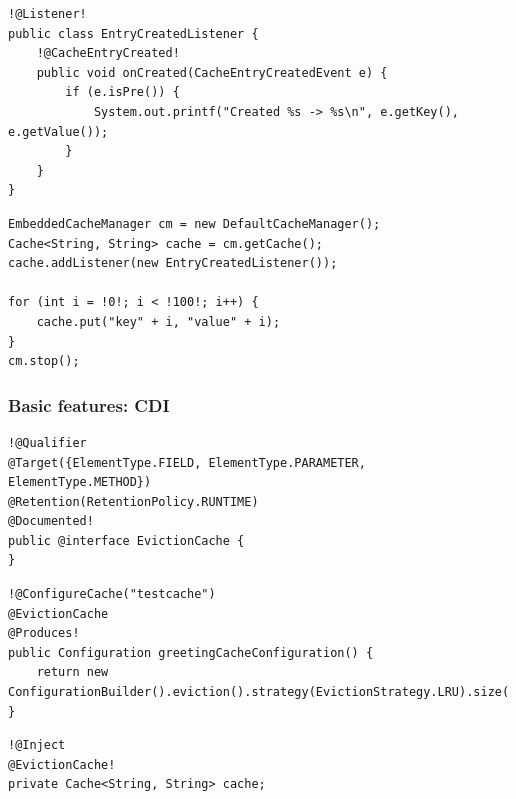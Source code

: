 \documentclass[10pt,utf8]{beamer}
\begin{document}
\begin{frame}[fragile]
	\begin{lstlisting}[style=Java]
!@Listener!
public class EntryCreatedListener {
    !@CacheEntryCreated!
    public void onCreated(CacheEntryCreatedEvent e) {
        if (e.isPre()) {
            System.out.printf("Created %s -> %s\n", e.getKey(), e.getValue());
        }
    }
}
	\end{lstlisting}
	\begin{lstlisting}[style=Java]
EmbeddedCacheManager cm = new DefaultCacheManager();
Cache<String, String> cache = cm.getCache();
cache.addListener(new EntryCreatedListener());

for (int i = !0!; i < !100!; i++) {
    cache.put("key" + i, "value" + i);
}
cm.stop();
	\end{lstlisting}
\end{frame}

\begin{frame}[fragile]
	\frametitle{Basic features: CDI}
	\begin{lstlisting}[style=Java]
!@Qualifier
@Target({ElementType.FIELD, ElementType.PARAMETER, ElementType.METHOD})
@Retention(RetentionPolicy.RUNTIME)
@Documented!
public @interface EvictionCache {
}  
	\end{lstlisting}
	\begin{lstlisting}[style=Java]
!@ConfigureCache("testcache")
@EvictionCache
@Produces!
public Configuration greetingCacheConfiguration() {
    return new ConfigurationBuilder().eviction().strategy(EvictionStrategy.LRU).size(!5!).build();
}
	\end{lstlisting}
	\begin{lstlisting}[style=Java]
!@Inject
@EvictionCache!
private Cache<String, String> cache;
	\end{lstlisting}
\end{frame}
\end{document}
